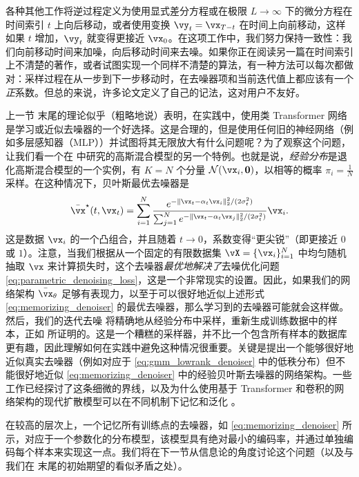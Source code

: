 \documentclass[../../book-main_zh.tex]{subfiles}
\begin{document}
\begin{remark}
	各种其他工作将逆过程定义为使用显式差分方程或在极限 \(L \to \infty\) 下的微分方程在时间索引 \(t\) 上向后移动，或者使用变换 \(\vy_{t} = \vx_{T - t}\) 在时间上向前移动，这样如果 \(t\) 增加，\(\vy_{t}\) 就变得更接近 \(\vx_{0}\)。在这项工作中，我们努力保持一致性：我们向前移动时间来加噪，向后移动时间来去噪。如果你正在阅读另一篇在时间索引上不清楚的著作，或者试图实现一个同样不清楚的算法，有一种方法可以每次都做对：采样过程在从一步到下一步移动时，在去噪器项和当前迭代值上都应该有一个\textit{正}系数。但总的来说，许多论文定义了自己的记法，这对用户不友好。
\end{remark}

\begin{remark}
	上一节  末尾的理论似乎（粗略地说）表明，在实践中，使用类 Transformer 网络是学习或近似去噪器的一个好选择。这是合理的，但是使用任何旧的神经网络（例如多层感知器（MLP））并试图将其无限放大有什么问题呢？为了观察这个问题，让我们看一个在  中研究的高斯混合模型的另一个特例。也就是说，\textit{经验分布}是退化高斯混合模型的一个实例，有 \(K = N\) 个分量 \(\dNorm(\vx_{i}, \vzero)\)，以相等的概率 \(\pi_{i} = \frac{1}{N}\) 采样。在这种情况下，贝叶斯最优去噪器是
	\begin{equation}\label{eq:memorizing_denoiser}
		\bar{\vx}^{\star}(t, \vx_{t}) = \sum_{i = 1}^{N}\frac{e^{-\|\vx_{t} - \alpha_{t}\vx_{i}\|_{2}^{2}/(2\sigma_{t}^{2})}}{\sum_{j = 1}^{N}e^{-\|\vx_{t} - \alpha_{t}\vx_{j}\|_{2}^{2}/(2\sigma_{t}^{2})}}\vx_{i}.
	\end{equation}
	这是数据 \(\vx_{i}\) 的一个凸组合，并且随着 \(t \to 0\)，系数变得“更尖锐”（即更接近 \(0\) 或 \(1\)）。注意，当我们根据从一个固定的有限数据集 \(\vX = \{\vx_{i}\}_{i = 1}^{N}\) 中均匀随机抽取 \(\vx\) 来计算损失时，这个去噪器\textit{最优地解决了}去噪优化问题 \eqref{eq:parametric_denoising_loss}，这是一个非常现实的设置。因此，如果我们的网络架构 \(\bar{\vx}_{\theta}\) 足够有表现力，以至于可以很好地近似上述形式 \eqref{eq:memorizing_denoiser} 的最优去噪器，那么学习到的去噪器可能就会这样做。然后，我们的迭代去噪  将精确地从经验分布中采样，重新生成训练数据中的样本，正如  所证明的。这是一个糟糕的采样器，并不比一个包含所有样本的数据库更有趣，因此理解如何在实践中避免这种情况很重要。关键是提出一个能够很好地近似真实去噪器（例如对应于 \eqref{eq:gmm_lowrank_denoiser} 中的低秩分布）但不能很好地近似 \eqref{eq:memorizing_denoiser} 中的经验贝叶斯去噪器的网络架构。一些工作已经探讨了这条细微的界线，以及为什么使用基于 Transformer 和卷积的网络架构的现代扩散模型可以在不同机制下记忆和泛化 \citep{kamb2024analytic,niedoba2024towards}。

	在较高的层次上，一个记忆所有训练点的去噪器，如 \eqref{eq:memorizing_denoiser} 所示，对应于一个参数化的分布模型，该模型具有绝对最小的编码率，并通过单独编码每个样本来实现这一点。我们将在下一节从信息论的角度讨论这个问题（以及与我们在  末尾的初始期望的看似矛盾之处）。
\end{remark}
\end{document}
